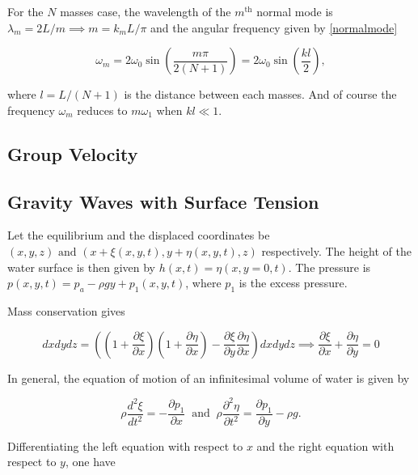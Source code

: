 \documentclass[a4paper,12pt]{report}
\begin{document}
For the \(N\) masses case, the wavelength of the \(m^{\text{th}} \) normal mode is \(\lambda _{m} = 2L /m \implies m = k_{m}L /\pi  \) and the angular frequency given by \cref{normalmode}

\begin{equation}
	\omega _{m} = 2 \omega _{0} \sin \left( \frac{m\pi }{2(N+1)}  \right) =  2 \omega _{0}\sin \left( \frac{kl}{2}  \right),
\end{equation}

where \(l = L /(N+1)\) is the distance between each masses. And of course the frequency \(\omega _{m} \) reduces to \(m \omega _{1} \) when \(kl \ll  1\).    

\subsection{Group Velocity}



\subsection{Gravity Waves with Surface Tension}

Let the equilibrium and the displaced coordinates be \((x,y,z) \text { and } (x+\xi (x,y,t), y+\eta (x,y,t),z)\) respectively. The height of the water surface is then given by \(h(x,t) = \eta (x,y=0,t)\). The pressure is \(p(x,y,t) = p_{a} - \rho gy + p_1 (x,y,t)\), where \(p_1 \) is the excess pressure.

Mass conservation gives 

\begin{equation}
	dxdydz = \left( \left( 1+\frac{\partial \xi }{\partial x}  \right) \left( 1+\frac{\partial \eta }{\partial x}  \right) - \frac{\partial \xi }{\partial y} \frac{\partial \eta }{\partial x}   \right)dxdydz \implies \frac{\partial \xi }{\partial x} + \frac{\partial \eta }{\partial y}= 0  
\end{equation}

In general, the equation of motion of an infinitesimal volume of water is given by 

\begin{equation}
	\rho \frac{d^2\xi }{dt^2} = - \frac{\partial p_1 }{\partial x} ~\text { and }~ \rho \frac{\partial^2 \eta }{\partial t^2} = \frac{\partial p_1}{\partial y} - \rho g.    
\end{equation}

Differentiating the left equation with respect to \(x\) and the right equation with respect to \(y\), one have 
\end{document}

